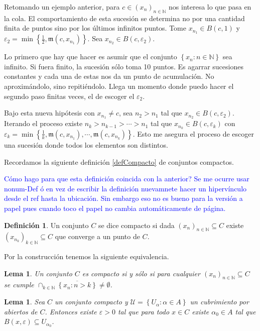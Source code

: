 \documentclass[12pt]{article}
\theoremstyle{plain}
\newtheorem{Lem}[Th]{Lema}             %
\theoremstyle{definition}
\newtheorem{Def}[Th]{Definición}       %
\theoremstyle{remark}
\numberwithin{equation}{section}
\newcommand{\bN}{\mathbb{N}}        %
\newcommand{\mm}{\mathfrak{m}}      %
\newcommand{\cU}{\mathcal{U}}       %
\renewcommand{\:}{\colon}           %
\newcommand{\conj}[1]{\left\lbrace#1\right\rbrace}
\begin{document}
\begin{multicols}{2}
Retomando un ejemplo anterior, para $c\in(x_n)_{n\in\bN}$ nos interesa lo que pasa en la cola. El comportamiento de esta sucesión se determina no por una cantidad finita de puntos sino por los últimos infinitos puntos. Tome $x_{n_1}\in B(c,1)$ y $\varepsilon_2=\min\conj{\frac{1}{2},\mm(c,x_{n_1})}$. Sea $x_{n_2}\in B(c,\varepsilon_2)$. \par
Lo primero que hay que hacer es asumir que el conjunto $\conj{x_n\colon n\in\bN}$ sea infinito. Si fuera finito, la sucesión sólo toma 10 puntos. Es agarrar sucesiones constantes y cada una de estas nos da un punto de acumulación. No aproximándolo, sino repitiéndolo. Llega un momento donde puedo hacer el segundo paso finitas veces, el de escoger el $\varepsilon_2$.\par
Bajo esta nueva hipótesis con $x_{n_1}\neq c$, sea $n_2>n_1$ tal que $x_{n_2}\in B(c,\varepsilon_2)$. Iterando el proceso existe $n_k>n_{k-1}>\cdots>n_1$ tal que $x_{n_k}\in B(c,\varepsilon_k)$ con $\varepsilon_k=\min\conj{\frac{1}{k},\mm(c,x_{n_1}),\cdots,\mm(c,x_{n_k})}$. Esto me asegura el proceso de escoger una sucesión donde todos los elementos son distintos.\par
Recordamos la siguiente definición \ref{defCompacto} de conjuntos compactos.\par
\textcolor{blue}{Cómo hago para que esta definición coincida con la anterior? Se me ocurre usar nonum-Def ó en vez de escribir la definición nuevamnete hacer un hipervínculo desde el ref hasta la ubicación. Sin embargo eso no es bueno para la versión a papel pues cuando toco el papel no cambia automáticamente de página.}
\begin{Def}
  Un conjunto $C$ se dice compacto si dada $(x_n)_{n\in\bN}\subseteq C$ existe $(x_{n_k})_{k\in\bN}\subseteq C$ que converge a un punto de $C$.
\end{Def}
Por la construcción tenemos la siguiente equivalencia.

\begin{Lem}
  Un conjunto $C$ es compacto si y sólo si para cualquier $(x_n)_{n\in\bN}\subseteq C$ se cumple $\cap_{k\in\bN}\overline{\conj{x_n\colon n>k}}\neq\emptyset$.
\end{Lem}

\begin{Lem}
  Sea $C$ un conjunto compacto y $\cU=\conj{U_\alpha\colon\alpha\in A}$ un cubrimiento por abiertos de $C$. Entonces existe $\varepsilon>0$ tal que para todo $x\in C$ existe $\alpha_0\in A$ tal que $B(x,\varepsilon)\subseteq U_{\alpha_0}$.
\end{Lem}


\end{multicols}
\end{document}
